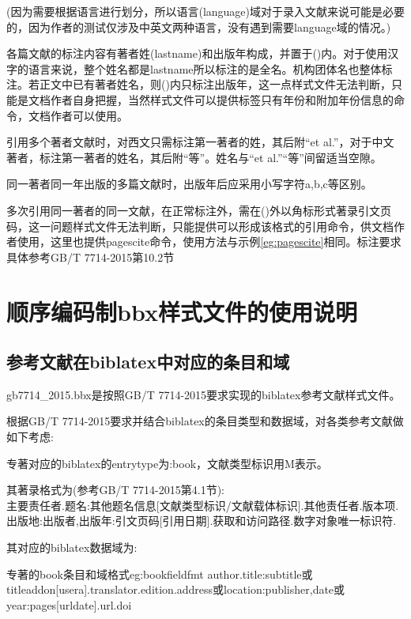 \documentclass[11pt]{article} %
\begin{document}
(因为需要根据语言进行划分，所以语言(language)域对于录入文献来说可能是必要的，因为作者的测试仅涉及中英文两种语言，没有遇到需要language域的情况。)

各篇文献的标注内容有著者姓(lastname)和出版年构成，并置于()内。对于使用汉字的语言来说，整个姓名都是lastname所以标注的是全名。机构团体名也整体标注。若正文中已有著者姓名，则()内只标注出版年，这一点样式文件无法判断，只能是文档作者自身把握，当然样式文件可以提供标签只有年份和附加年份信息的命令，文档作者可以使用。

引用多个著者文献时，对西文只需标注第一著者的姓，其后附“et al.”，对于中文著者，标注第一著者的姓名，其后附“等”。姓名与“et al.”“等”间留适当空隙。

同一著者同一年出版的多篇文献时，出版年后应采用小写字符a,b,c等区别。

多次引用同一著者的同一文献，在正常标注外，需在()外以角标形式著录引文页码，这一问题样式文件无法判断，只能提供可以形成该格式的引用命令，供文档作者使用，这里也提供pagescite命令，使用方法与示例\ref{eg:pagescite}相同。标注要求具体参考GB/T 7714-2015第10.2节


\section{顺序编码制bbx样式文件的使用说明}

\subsection{参考文献在biblatex中对应的条目和域}\label{sec:numeric:data}
gb7714\_2015.bbx是按照GB/T 7714-2015要求实现的biblatex参考文献样式文件。

根据GB/T 7714-2015要求并结合biblatex的条目类型和数据域，对各类参考文献做如下考虑:
\begin{refentry}{}{}
专著对应的biblatex的entrytype为:book，文献类型标识用M表示。

其著录格式为(参考GB/T 7714-2015第4.1节):\\
主要责任者.题名:其他题名信息[文献类型标识/文献载体标识].其他责任者.版本项.出版地:出版者,出版年:引文页码[引用日期].获取和访问路径.数字对象唯一标识符.
\end{refentry}

其对应的biblatex数据域为:
\begin{codetex}{专著的book条目和域格式}{eg:bookfieldfmt}
author.title:subtitle或titleaddon[usera].translator.edition.address或location:publisher,date或year:pages[urldate].url.doi
\end{codetex}
\end{document}
